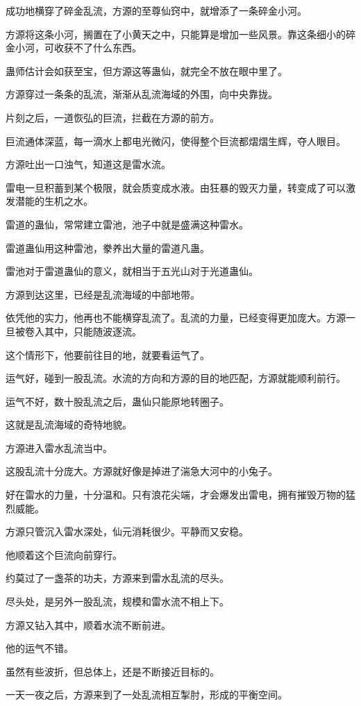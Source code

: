 \begin{this_body}
成功地横穿了碎金乱流，方源的至尊仙窍中，就增添了一条碎金小河。

方源将这条小河，搁置在了小黄天之中，只能算是增加一些风景。靠这条细小的碎金小河，可收获不了什么东西。

蛊师估计会如获至宝，但方源这等蛊仙，就完全不放在眼中里了。

方源穿过一条条的乱流，渐渐从乱流海域的外围，向中央靠拢。

片刻之后，一道恢弘的巨流，拦截在方源的前方。

巨流通体深蓝，每一滴水上都电光微闪，使得整个巨流都熠熠生辉，夺人眼目。

方源吐出一口浊气，知道这是雷水流。

雷电一旦积蓄到某个极限，就会质变成水液。由狂暴的毁灭力量，转变成了可以激发潜能的生机之水。

雷道的蛊仙，常常建立雷池，池子中就是盛满这种雷水。

雷道蛊仙用这种雷池，豢养出大量的雷道凡蛊。

雷池对于雷道蛊仙的意义，就相当于五光山对于光道蛊仙。

方源到达这里，已经是乱流海域的中部地带。

依凭他的实力，他再也不能横穿乱流了。乱流的力量，已经变得更加庞大。方源一旦被卷入其中，只能随波逐流。

这个情形下，他要前往目的地，就要看运气了。

运气好，碰到一股乱流。水流的方向和方源的目的地匹配，方源就能顺利前行。

运气不好，数十股乱流之后，蛊仙只能原地转圈子。

这就是乱流海域的奇特地貌。

方源进入雷水乱流当中。

这股乱流十分庞大。方源就好像是掉进了湍急大河中的小兔子。

好在雷水的力量，十分温和。只有浪花尖端，才会爆发出雷电，拥有摧毁万物的猛烈威能。

方源只管沉入雷水深处，仙元消耗很少。平静而又安稳。

他顺着这个巨流向前穿行。

约莫过了一盏茶的功夫，方源来到雷水乱流的尽头。

尽头处，是另外一股乱流，规模和雷水流不相上下。

方源又钻入其中，顺着水流不断前进。

他的运气不错。

虽然有些波折，但总体上，还是不断接近目标的。

一天一夜之后，方源来到了一处乱流相互掣肘，形成的平衡空间。


\end{this_body}
